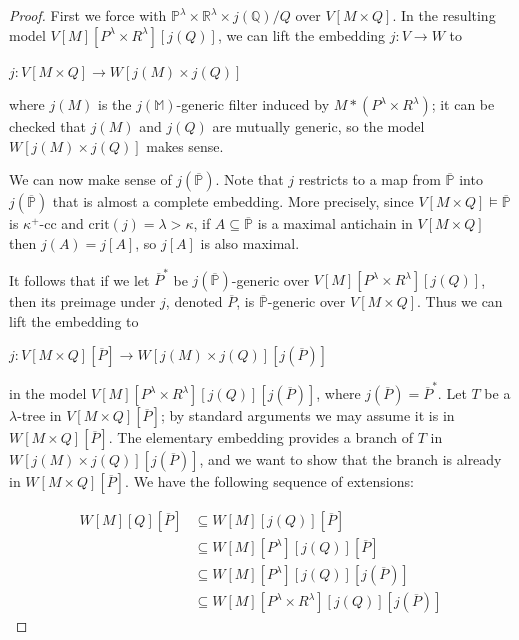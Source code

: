 \documentclass[10pt,reqno]{amsart}
\theoremstyle{plain}
\theoremstyle{definition}
\theoremstyle{remark}
\begin{document}
\begin{proof}
First we force with $\mathbb{P}^\lambda\times \mathbb{R}^\lambda\times j(\mathbb{Q})/Q$ over $V[M\times Q]$. In the resulting model $V[M][P^\lambda\times R^\lambda][j(Q)]$, we can lift the embedding $j:V\rightarrow W$ to

\begin{center}
$j:V[M\times Q]\rightarrow W[j(M)\times j(Q)]$
\end{center}

\noindent where $j(M)$ is the $j(\mathbb{M})$-generic filter induced by $M*(P^\lambda\times R^\lambda)$; it can be checked that $j(M)$ and $j(Q)$ are mutually generic, so the model $W[j(M)\times j(Q)]$ makes sense.

We can now make sense of $j(\mathbb{\overline{P}})$. Note that $j$ restricts to a map from $\overline{\mathbb{P}}$ into $j(\overline{\mathbb{P}})$ that is almost a complete embedding. More precisely, since $V[M\times Q]\models\mathbb{\overline{P}}$ is $\kappa^+$-cc and $\mathrm{crit}(j)=\lambda>\kappa$, if $A\subseteq\overline{\mathbb{P}}$ is a maximal antichain in $V[M\times Q]$ then $j(A)=j[A]$, so $j[A]$ is also maximal.

It follows that if we let $\overline{P}^*$ be $j(\mathbb{\overline{P}})$-generic over $V[M][P^\lambda\times R^\lambda][j(Q)]$, then its preimage under $j$, denoted $\overline{P}$, is $\overline{\mathbb{P}}$-generic over $V[M\times Q]$. Thus we can lift the embedding to

\begin{center}
$j:V[M\times Q][\overline{P}]\rightarrow W[j(M)\times j(Q)][j(\overline{P})]$
\end{center}

\noindent in the model $V[M][P^\lambda\times R^\lambda][j(Q)][j(\overline{P})]$, where $j(\overline{P})=\overline{P}^*$. Let $T$ be a $\lambda$-tree in $V[M\times Q][\overline{P}]$; by standard arguments we may assume it is in $W[M\times Q][\overline{P}]$. The elementary embedding provides a branch of $T$ in $W[j(M)\times j(Q)][j(\overline{P})]$, and we want to show that the branch is already in $W[M\times Q][\overline{P}]$. We have the following sequence of extensions:

\begin{align}
W[M][Q][\overline{P}]&\subseteq W[M][j(Q)][\overline{P}]\\
&\subseteq W[M][P^\lambda][j(Q)][\overline{P}]\\
&\subseteq W[M][P^\lambda][j(Q)][j(\overline{P})]\\
&\subseteq W[M][P^\lambda\times R^\lambda][j(Q)][j(\overline{P})]
\end{align}


\end{proof}
\end{document}
